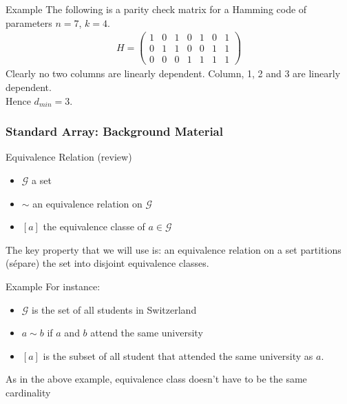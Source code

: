 \begin{parag}{Example}
    The following is a parity check matrix for a Hamming code of parameters $n =  7$, $k =  4$.
    \begin{align*} 
	    H =  \begin{pmatrix} 1 & 0 & 1 & 0 & 1 & 0 & 1 \\ 0 & 1 & 1 & 0 & 0 & 1 & 1 \\ 0 & 0 & 0 & 1 & 1 & 1 & 1 \end{pmatrix} 
    \end{align*}
    Clearly no two columns are linearly dependent. Column, 1, 2 and $3$ are linearly dependent.\\
    Hence $d_{min} =  3$.
\end{parag}

\subsubsection{Standard Array: Background Material}

\begin{parag}{Equivalence Relation (review)}
    \begin{itemize}
	    \item $\mathcal{G}$ a set
	    \item $\sim$ an equivalence relation on $\mathcal{G}$
	    \item $\left[a\right]$ the equivalence classe of $a \in \mathcal{G}$
    \end{itemize}
    The key property that we will use is: an equivalence relation on a set partitions (sépare) the set into disjoint equivalence classes.
    
    \begin{subparag}{Example}
        For instance:
	\begin{itemize}
		\item $\mathcal{G}$ is the set of all students in Switzerland
		\item $a \sim b$ if $a$ and $b$ attend the same university
		\item $\left[a\right]$ is the subset of all student that attended the same university as $a$.
	\end{itemize}
	\begin{framedremark}
	As in the above example, equivalence class doesn't have to be the same cardinality
	\end{framedremark}
    \end{subparag}
\end{parag}

